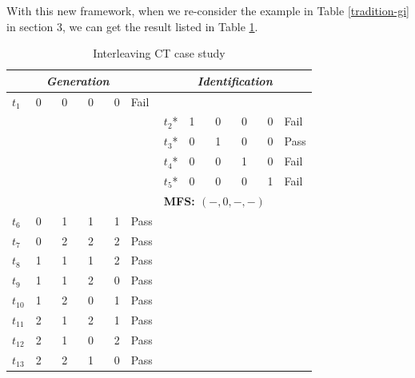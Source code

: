 \documentclass{sig-alternate}
\begin{document}
With this new framework, when we re-consider the example in Table \ref{tradition-gi} in section 3,  we can get the result listed in Table \ref{new-gi}.
\begin{table}[h]
\caption{Interleaving CT case study}
\label{new-gi}
\center
\begin{tabular}{llllll|llllll}
\hline
 & \multicolumn{4}{c}{\bfseries \emph{Generation}}& & \multicolumn{6}{c}{\bfseries \emph{Identification}} \\
 \hline
$t_{1}$ & \multicolumn{4}{l}{0 \ \ \ 0 \ \ \ 0  \ \ \  0 } & Fail & \multicolumn{6}{l}{}\\
\multicolumn{5}{l}{}& & $t_{2}$* &\multicolumn{4}{l}{1  \ \ \  0 \ \ \  0 \ \ \  0 }& Fail \\
\multicolumn{5}{l}{}& &$t_{3}$* &\multicolumn{4}{l}{0  \ \ \   1 \ \ \  0 \ \ \  0} & Pass \\
\multicolumn{5}{l}{}& &$t_{4}$* &\multicolumn{4}{l}{0  \ \ \   0 \ \ \   1 \ \ \  0} & Fail \\
\multicolumn{5}{l}{}& &$t_{5}$* &\multicolumn{4}{l}{0  \ \ \   0 \ \ \   0 \ \ \   1} & Fail \\
\multicolumn{5}{l}{}& &\multicolumn{6}{l}{ \bfseries{MFS}: $(-, 0, - , -)$ }  \\
$t_{6}$ &\multicolumn{4}{l}{0 \ \ \ 1 \ \ \ 1  \ \ \  1 } & Pass & \multicolumn{6}{l}{}\\
$t_{7}$ &\multicolumn{4}{l}{0 \ \ \ 2 \ \ \ 2  \ \ \  2 } & Pass & \multicolumn{6}{l}{}\\
$t_{8}$ &\multicolumn{4}{l}{1  \ \ \ 1 \ \ \ 1  \ \ \  2 } & Pass & \multicolumn{6}{l}{}\\
$t_{9}$ &\multicolumn{4}{l}{1  \ \ \  1 \ \ \ 2 \ \ \ 0 } & Pass & \multicolumn{6}{l}{}\\
$t_{10}$ &\multicolumn{4}{l}{1  \ \ \   2 \ \ \   0 \ \ \ 1} & Pass & \multicolumn{6}{l}{}\\
$t_{11}$ &\multicolumn{4}{l}{2  \ \ \   1 \ \ \ 2  \ \ \  1 } & Pass & \multicolumn{6}{l}{}\\
$t_{12}$ &\multicolumn{4}{l}{2  \ \ \   1 \ \ \ 0  \ \ \  2 } & Pass & \multicolumn{6}{l}{}\\
$t_{13}$ &\multicolumn{4}{l}{2  \ \ \   2 \ \ \ 1  \ \ \  0 } & Pass & \multicolumn{6}{l}{}\\
\hline
\end{tabular}
\end{table}
\end{document}
